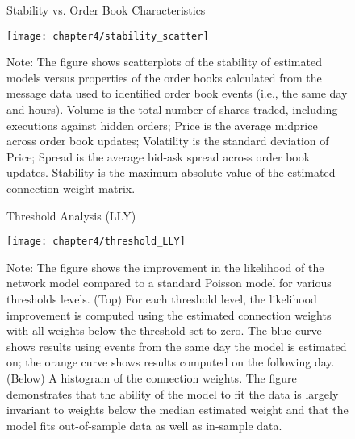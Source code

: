 \begin{figure}[ht!]
\small
\linespread{1}
\centering
\captionsetup{labelsep=colon, font=footnotesize, justification=centerfirst, width=\linewidth}
\caption{Stability vs. Order Book Characteristics}
\label{fig:stability_scatter}
\texttt{[image: chapter4/stability\_scatter]}
\captionsetup{position=below, font=footnotesize, justification=justified, width=\linewidth}
\caption*{Note: The figure shows scatterplots of the stability of estimated models versus properties of the order books calculated from the message data used to identified order book events (i.e., the same day and hours). Volume is the total number of shares traded, including executions against hidden orders; Price is the average midprice across order book updates; Volatility is the standard deviation of Price; Spread is the average bid-ask spread across order book updates. Stability is the maximum absolute value of the estimated connection weight matrix.}
\end{figure}

\begin{figure}[ht!]
\small
\linespread{1}
\centering
\captionsetup{labelsep=colon, font=footnotesize, justification=centerfirst, width=\linewidth}
\caption{Threshold Analysis (LLY)}
\label{fig:threshold_LLY}
\texttt{[image: chapter4/threshold\_LLY]}
\captionsetup{position=below, font=footnotesize, justification=justified, width=\linewidth}
\caption*{Note: The figure shows the improvement in the likelihood of the network model compared to a standard Poisson model for various thresholds levels. (Top) For each threshold level, the likelihood improvement is computed using the estimated connection weights with all weights below the threshold set to zero. The blue curve shows results using events from the same day the model is estimated on; the orange curve shows results computed on the following day. (Below) A histogram of the connection weights. The figure demonstrates that the ability of the model to fit the data is largely invariant to weights below the median estimated weight and that the model fits out-of-sample data as well as in-sample data.}
\end{figure}

